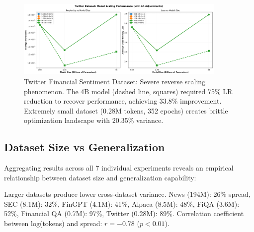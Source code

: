 \begin{figure}[htbp]
\centering
\includegraphics[width=0.9\textwidth]{figures/scaling_twitter.png}
\caption[Twitter Financial Sentiment Dataset: Reverse Scaling]{Twitter Financial Sentiment Dataset: Severe reverse scaling phenomenon. The 4B model (dashed line, squares) required 75\% LR reduction to recover performance, achieving 33.8\% improvement. Extremely small dataset (0.28M tokens, 352 epochs) creates brittle optimization landscape with 20.35\% variance.}
\label{fig:scaling_twitter}
\end{figure}





\subsection{Dataset Size vs Generalization}

Aggregating results across all 7 individual experiments reveals an empirical relationship between dataset size and generalization capability:

Larger datasets produce lower cross-dataset variance. News (194M): 26\% spread, SEC (8.1M): 32\%, FinGPT (4.1M): 41\%, Alpaca (8.5M): 48\%, FiQA (3.6M): 52\%, Financial QA (0.7M): 97\%, Twitter (0.28M): 89\%. Correlation coefficient between log(tokens) and spread: $r = -0.78$ ($p < 0.01$).

